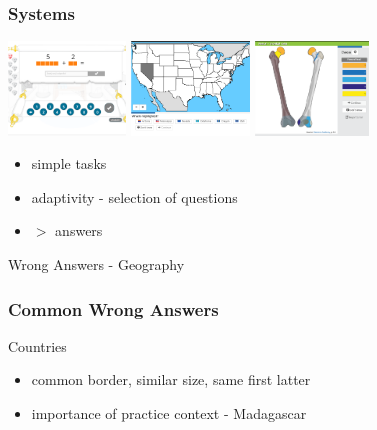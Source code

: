 \documentclass[xcolor=svgnames]{beamer}
\begin{document}
\begin{frame}
    \frametitle{Systems}
    \small
    \includegraphics[height=2.5cm]{figures/matmat.png}
    \hfill
    \includegraphics[height=2.5cm]{figures/slepemapy.png}
    \hfill
    \includegraphics[height=2.5cm]{figures/anatom.png}

    \begin{itemize}
        \item simple tasks
        \item adaptivity - selection of questions
        \item $>$  answers
    \end{itemize}
\end{frame}
\begin{frame}
    \centering
    \huge Wrong Answers - Geography
\end{frame}
\begin{frame}
    \frametitle{Common Wrong Answers}
    \Large
    Countries
    \begin{itemize}
        \item common border, similar size, same first latter
        \item importance of practice context - Madagascar
    \end{itemize}
\end{frame}
\end{document}
